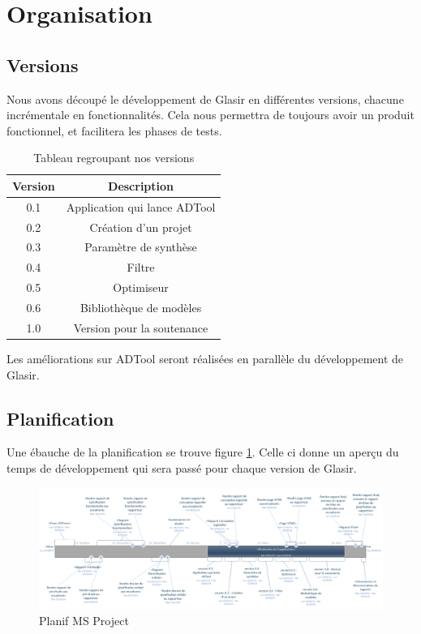\section{Organisation}

	\subsection{Versions}
		Nous avons découpé le développement de Glasir en différentes versions, chacune incrémentale en fonctionnalités.
		Cela nous permettra de toujours avoir un produit fonctionnel, et facilitera les phases de tests.

		\begin{table}[h!]
			\begin{center}
			\begin{tabular}{|c|c|}
				\hline
				Version & Description\\
				\hline
				0.1 & Application qui lance ADTool\\
				\hline
				0.2 & Création d'un projet\\
				\hline
				0.3 & Paramètre de synthèse\\
				\hline
				0.4 & Filtre\\
				\hline
				0.5 & Optimiseur\\
				\hline
				0.6 & Bibliothèque de modèles\\
				\hline
				1.0 & Version pour la soutenance\\
				\hline
			\end{tabular}
			\end{center}
			\caption{Tableau regroupant nos versions}
		\end{table} %

		Les améliorations sur ADTool seront réalisées en parallèle du développement de Glasir.

	\subsection{Planification}
		Une ébauche de la planification se trouve figure \ref{fig:planif}. Celle ci donne un aperçu du temps de développement qui sera passé pour chaque version de Glasir. 

		\begin{figure}
			\begin{center}
				\includegraphics[height=0.50\textwidth,angle=90]{figure/planification.png}
			\end{center}
			\caption{Planif MS Project}
			\label{fig:planif}
		\end{figure}

